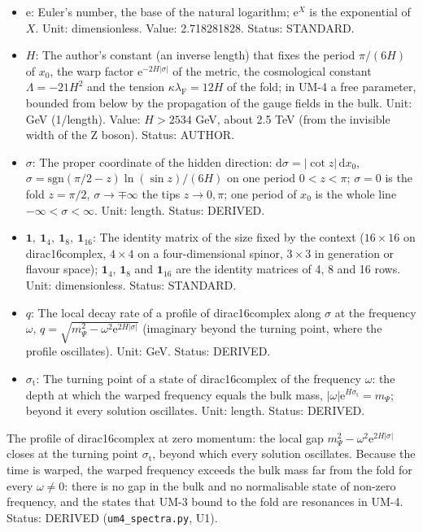 \documentclass[
  10pt,
]{article}
\begin{document}
\begin{itemize}
\item
  \(\mathrm{e}\): Euler's number, the base of the natural logarithm;
  \(\mathrm{e}^{X}\) is the exponential of \(X\). Unit: dimensionless.
  Value: 2.718281828. Status: STANDARD.
\item
  \(H\): The author's constant (an inverse length) that fixes the period
  \(\pi/(6H)\) of \(x_0\), the warp factor
  \(\mathrm{e}^{-2H\lvert\sigma\rvert}\) of the metric, the cosmological
  constant \(\Lambda = -21H^2\) and the tension
  \(\kappa\lambda_{\mathrm{F}} = 12H\) of the fold; in UM-4 a free
  parameter, bounded from below by the propagation of the gauge fields
  in the bulk. Unit: GeV (1/length). Value: \(H > 2534\) GeV, about 2.5
  TeV (from the invisible width of the Z boson). Status: AUTHOR.
\item
  \(\sigma\): The proper coordinate of the hidden direction:
  \(\mathrm{d}\sigma = \lvert\cot z\rvert\,\mathrm{d}x_0\),
  \(\sigma = \mathrm{sgn}(\pi/2 - z)\ln(\sin z)/(6H)\) on one period
  \(0 < z < \pi\); \(\sigma = 0\) is the fold \(z = \pi/2\),
  \(\sigma \to \mp\infty\) the tips \(z \to 0, \pi\); one period of
  \(x_0\) is the whole line \(-\infty < \sigma < \infty\). Unit: length.
  Status: DERIVED.
\item
  \(\mathbf{1},\ \mathbf{1}_4,\ \mathbf{1}_8,\ \mathbf{1}_{16}\): The
  identity matrix of the size fixed by the context (\(16 \times 16\) on
  dirac16complex, \(4 \times 4\) on a four-dimensional spinor,
  \(3 \times 3\) in generation or flavour space); \(\mathbf{1}_4\),
  \(\mathbf{1}_8\) and \(\mathbf{1}_{16}\) are the identity matrices of
  4, 8 and 16 rows. Unit: dimensionless. Status: STANDARD.
\item
  \(q\): The local decay rate of a profile of dirac16complex along
  \(\sigma\) at the frequency \(\omega\),
  \(q = \sqrt{m_\Psi^2 - \omega^2\mathrm{e}^{2H\lvert\sigma\rvert}}\)
  (imaginary beyond the turning point, where the profile oscillates).
  Unit: GeV. Status: DERIVED.
\item
  \(\sigma_{\mathrm{t}}\): The turning point of a state of
  dirac16complex of the frequency \(\omega\): the depth at which the
  warped frequency equals the bulk mass,
  \(\lvert\omega\rvert\mathrm{e}^{H\sigma_{\mathrm{t}}} = m_\Psi\);
  beyond it every solution oscillates. Unit: length. Status: DERIVED.
\end{itemize}

The profile of dirac16complex at zero momentum: the local gap
\(m_\Psi^2 - \omega^2\mathrm{e}^{2H\lvert\sigma\rvert}\) closes at the
turning point \(\sigma_{\mathrm{t}}\), beyond which every solution
oscillates. Because the time is warped, the warped frequency exceeds the
bulk mass far from the fold for every \(\omega \ne 0\): there is no gap
in the bulk and no normalisable state of non-zero frequency, and the
states that UM-3 bound to the fold are resonances in UM-4. Status:
DERIVED (\texttt{um4\_spectra.py}, U1).
\end{document}
